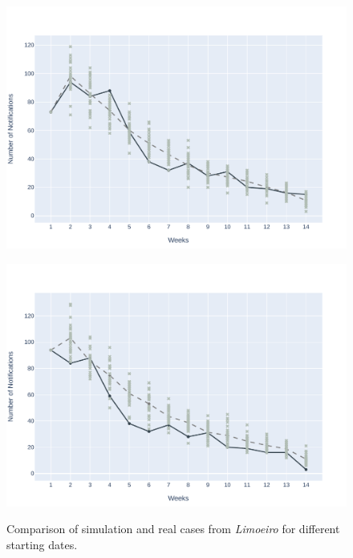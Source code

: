 \begin{figure}[!ht]
\begin{minipage}[c]{.45\textwidth}
		\vspace{-0.3cm}
	\end{minipage}
	\\
	\begin{minipage}[c]{.45\textwidth}
		\centering
		\includegraphics[scale=0.4]{images/experiments-lim/LIM-2020-07-19.pdf} \\
		\vspace{-0.3cm}
	\end{minipage}
	\hspace{0.5cm}
	\begin{minipage}[c]{.45\textwidth}
		\centering
		\includegraphics[scale=0.4]{images/experiments-lim/LIM-2020-07-26.pdf} \\
		\vspace{-0.3cm}
	\end{minipage}
	\caption{\label{fig:avg-result-lim} Comparison of simulation and real cases from \textit{Limoeiro} for different starting dates.}
\end{figure}

